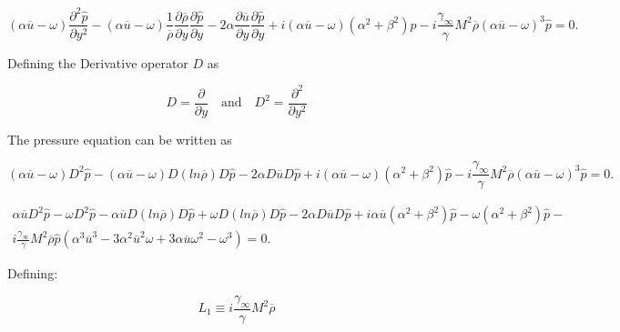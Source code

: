 \begin{equation*} 
\left(\alpha \overline{u}-\omega \right)
\frac{\partial^2 \hat{p}}{\partial y^2}
-
\left(\alpha \overline{u}-\omega \right)
\frac{1}{\overline{\rho}}
\frac{\partial \overline{\rho}}{\partial y}
\frac{\partial \hat{p}}{\partial y}
-
2
\alpha 
\frac{\partial \overline{u}}{\partial y}
\frac{\partial \hat{p}}{\partial y}
+
i
\left(\alpha \overline{u}-\omega \right)
(\alpha^2+\beta^2)
\hat{p}
-
i
\frac{\gamma_\infty}{\gamma}
M^{2}
\overline{\rho}
(\alpha\overline{u}-\omega )^3
\hat{p}
=
0
.
\end{equation*} 

Defining the Derivative  operator $D$ as 

\begin{equation}
    D=
    \frac{\partial }{\partial y}
    \quad
    \text{and}
    \quad
    D^2
    =
    \frac{\partial^2 }{\partial y^2}
\end{equation}

The pressure equation can be written as  

\begin{equation*} 
\left(\alpha \overline{u}-\omega \right)
D^2\hat{p}
-
\left(\alpha \overline{u}-\omega \right)
D (ln\overline{\rho})
D\hat{p}
-
2
\alpha 
D\overline{u}
D\hat{p}
+
i
\left(\alpha \overline{u}-\omega \right)
(\alpha^2+\beta^2)
\hat{p}
-
i
\frac{\gamma_\infty}{\gamma}
M^{2}
\overline{\rho}
(\alpha\overline{u}-\omega )^3
\hat{p}
=
0
.
\end{equation*} 

\begin{equation*} 
\begin{split}
\alpha \overline{u}
D^2\hat{p}
-
\omega 
D^2\hat{p}
-
\alpha \overline{u}
D (ln\overline{\rho})
D\hat{p}
+
\omega
D (ln\overline{\rho})
D\hat{p}
-
2
\alpha 
D\overline{u}
D\hat{p}
+
i
\alpha \overline{u}
(\alpha^2+\beta^2)
\hat{p}
-\omega
(\alpha^2+\beta^2)
\hat{p}
-
\\
i
\frac{\gamma_\infty}{\gamma}
M^{2}
\overline{\rho}
\hat{p}
(
\alpha^3\overline{u}^3-
3\alpha^2\overline{u}^2\omega+
3\alpha\overline{u}\omega^2-
\omega^3)
=
0
.
\end{split}
\end{equation*} 

Defining:

\begin{equation*}
L_1
\equiv
i
\frac{\gamma_\infty}{\gamma}
M^{2}
\overline{\rho}
\end{equation*}

